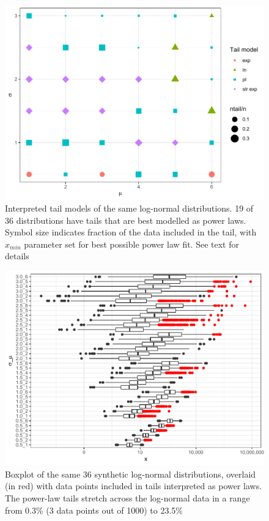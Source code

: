 \documentclass[
  12pt,
]{book}
\begin{document}
\begin{figure}

{\centering \includegraphics[width=0.9\linewidth]{bookdown-demo_files/figure-latex/05-ln-tail-1} 

}

\caption{Interpreted tail models of the same log-normal distributions. 19 of 36 distributions have tails that are best modelled as power laws. Symbol size indicates fraction of the data included in the tail, with \(x_{min}\) parameter set for best possible power law fit. See text for details}\label{fig:05-ln-tail}
\end{figure}



\begin{figure}

{\centering \includegraphics[width=0.9\linewidth]{bookdown-demo_files/figure-latex/05-ln-pl-1} 

}

\caption{Boxplot of the same 36 synthetic log-normal distributions, overlaid (in red) with data points included in tails interpreted as power laws. The power-law tails stretch across the log-normal data in a range from 0.3\% (3 data points out of 1000) to 23.5\%}\label{fig:05-ln-pl}
\end{figure}
\end{document}
